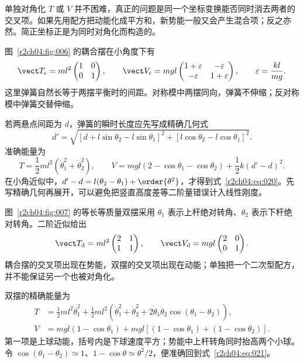单独对角化 $T$ 或 $V$ 并不困难，真正的问题是同一个坐标变换能否同时消去两者的交叉项。如果先用配方把动能化成平方和，新势能一般又会产生混合项；反之亦然。简正坐标正是为同时对角化而构造的。

图~\ref{r2ch04:fig:006} 的耦合摆在小角度下有
\begin{equation}
 \vect T_{\rm c}=ml^2\begin{pmatrix}1&0\\0&1\end{pmatrix},\qquad
 \vect V_{\rm c}=mgl\begin{pmatrix}1+\varepsilon&-\varepsilon\\-\varepsilon&1+\varepsilon\end{pmatrix},\qquad
 \varepsilon=\frac{kl}{mg}.
 \label{r2ch04:eq:020}
\end{equation}
这里弹簧自然长等于两摆平衡时的间距。对称模中两摆同向，弹簧不伸缩；反对称模中弹簧交替伸缩。

若两悬点间距为 $d$，弹簧的瞬时长度应先写成精确几何式
\[
 d'=\sqrt{[d+l\sin\theta_2-l\sin\theta_1]^2+
 [l\cos\theta_2-l\cos\theta_1]^2}.
\]
准确能量为
\[
 T=\frac12ml^2(\dot\theta_1^2+\dot\theta_2^2),\qquad
 V=mgl(2-\cos\theta_1-\cos\theta_2)+\frac12k(d'-d)^2.
\]
在小角近似中，$d'-d=l(\theta_2-\theta_1)+\order{\theta^2}$，才得到式~\eqref{r2ch04:eq:020}。先写精确几何再展开，可以避免把竖直高度差等二阶量错误计入线性刚度。
\figCoupledPendula

图~\ref{r2ch04:fig:007} 的等长等质量双摆采用 $\theta_1$ 表示上杆绝对转角、$\theta_2$ 表示下杆绝对转角。二阶近似给出
\begin{equation}
 \vect T_{\rm d}=ml^2\begin{pmatrix}2&1\\1&1\end{pmatrix},\qquad
 \vect V_{\rm d}=mgl\begin{pmatrix}2&0\\0&1\end{pmatrix}.
 \label{r2ch04:eq:021}
\end{equation}
耦合摆的交叉项出现在势能，双摆的交叉项出现在动能；单独把一个二次型配方，并不能保证另一个也被对角化。

双摆的精确能量为
\[
\begin{aligned}
 T&=\frac12ml^2\dot\theta_1^2+
 \frac12ml^2\!\left(\dot\theta_1^2+\dot\theta_2^2+
 2\dot\theta_1\dot\theta_2\cos(\theta_1-\theta_2)\right),\\
 V&=mgl(1-\cos\theta_1)+
 mgl[(1-\cos\theta_1)+(1-\cos\theta_2)].
\end{aligned}
\]
第一项是上球动能，括号内是下球速度平方；势能中上杆转角同时抬高两个小球。令
$\cos(\theta_1-\theta_2)\simeq1$、$1-\cos\theta\simeq\theta^2/2$，便准确回到式~\eqref{r2ch04:eq:021}。

